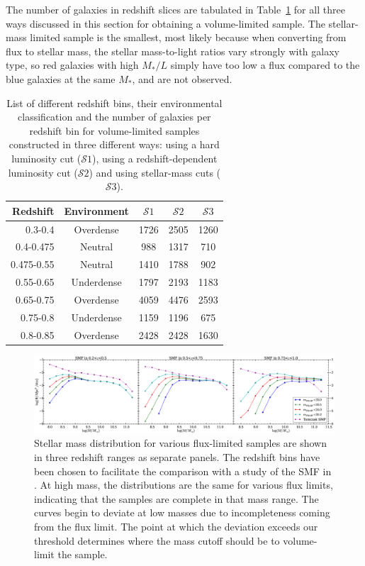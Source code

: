 \documentclass[twocolumn,useAMS,usenatbib]{mn2e}
\newcommand{\s}{\ensuremath{\mathcal{S}}}
\begin{document}
The number of galaxies in redshift slices
are tabulated in Table~\ref{table:GalaxyCounts} for all three ways
discussed in this section for obtaining a volume-limited sample. The
stellar-mass limited sample is the smallest, most likely because when
converting from flux to stellar mass, the stellar mass-to-light ratios
vary strongly with galaxy type, so red galaxies with high $M_*/L$
simply have too low a flux compared to the blue galaxies at the same
$M_*$, and are not observed.

\begin{table} 
\centering
\begin{tabular}{|r|c|c|c|c|}
 \hline
 Redshift & Environment & \s$1$ & \s$2$ & \s$3$ \\
 \hline
 0.3-0.4 & Overdense & 1726 & 2505 & 1260 \\
 0.4-0.475 & Neutral & 988 & 1317 & 710 \\
 0.475-0.55 & Neutral & 1410 & 1788 & 902 \\
 0.55-0.65 & Underdense & 1797 & 2193 & 1183 \\
 0.65-0.75 & Overdense & 4059 & 4476 & 2593 \\
 0.75-0.8 & Underdense & 1159 & 1196 & 675 \\
 0.8-0.85 & Overdense & 2428 & 2428 & 1630 \\
 \hline
\end{tabular}
\caption{List of different redshift bins, their environmental
  classification and the number of galaxies per redshift bin for
  volume-limited samples constructed in three different ways: using a
  hard luminosity cut (\s$1$), using a redshift-dependent luminosity cut (\s$2$) and using stellar-mass cuts (\s$3$).}
\label{table:GalaxyCounts}
\end{table}

\begin{figure}
 \centering
 \includegraphics[width=2.2\columnwidth]{SMF}
 \caption{Stellar mass distribution for various flux-limited samples
   are shown in three redshift ranges as separate panels. The redshift
   bins have been chosen to facilitate the comparison with  
          a study of the SMF in \protect\cite{Tomczak_SMF}. At high mass, the
          distributions are the same for various flux limits,
          indicating that the samples are complete in that mass
          range. The curves begin to deviate at low masses due to
          incompleteness coming from the flux limit.  The point at
          which the deviation exceeds our threshold determines where the mass cutoff should be to volume-limit the sample.}
 \label{fig:smf}
\end{figure}
\end{document}
